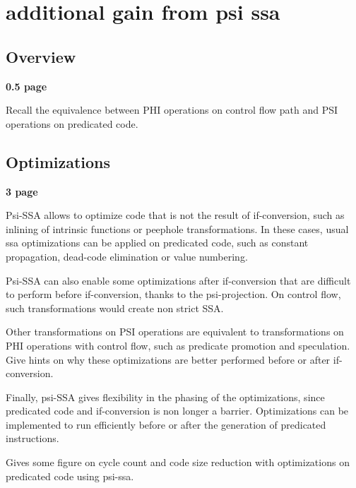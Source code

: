 \chapter{additional gain from psi ssa }




\section{Overview}

\textbf{0.5 page}

Recall the equivalence between PHI operations on control flow path and PSI operations on predicated code.


\section{Optimizations}

\textbf{3 page}

Psi-SSA allows to optimize code that is not the result of if-conversion, such as inlining of intrinsic functions or peephole transformations. In these cases, usual ssa optimizations can be applied on predicated code, such as constant propagation, dead-code elimination or value numbering.

Psi-SSA can also enable some optimizations after if-conversion that are difficult to perform before if-conversion, thanks to the psi-projection. On control flow, such transformations would create non strict SSA.

Other transformations on PSI operations are equivalent to transformations on PHI operations with control flow, such as predicate promotion and speculation. Give hints on why these optimizations are better performed before or after if-conversion.

Finally, psi-SSA gives flexibility in the phasing of the optimizations, since predicated code and if-conversion is non longer a barrier. Optimizations can be implemented to run efficiently before or after the generation of predicated instructions.

Gives some figure on cycle count and code size reduction with optimizations on predicated code using psi-ssa.
